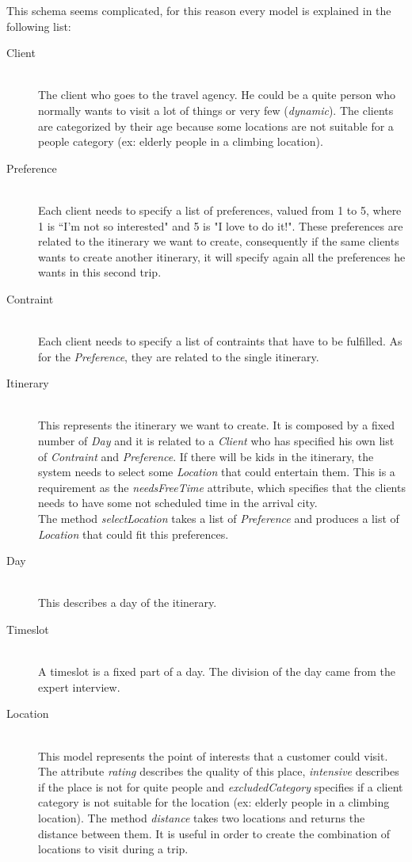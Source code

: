 \documentclass[11pt]{article} %
\begin{document}
This schema seems complicated, for this reason every model is explained in the following list:
\begin{description}
  \item[Client] \hfill \\
  The client who goes to the travel agency. He could be a quite person who normally wants to visit a lot of things or very few (\emph{dynamic}). The clients are categorized by their age because some locations are not suitable for a people category (ex: elderly people in a climbing location).

  \item[Preference] \hfill \\
  Each client needs to specify a list of preferences, valued from 1 to 5, where 1 is ``I'm not so interested" and 5 is "I love to do it!". These preferences are related to the itinerary we want to create, consequently if the same clients wants to create another itinerary, it will specify again all the preferences he wants in this second trip.
  \item[Contraint] \hfill \\
  Each client needs to specify a list of contraints that have to be fulfilled. As for the \emph{Preference}, they are related to the single itinerary.
  \item[Itinerary] \hfill \\
  This represents the itinerary we want to create. It is composed by a fixed number of \emph{Day} and it is related to a \emph{Client} who has specified his own list of \emph{Contraint} and \emph{Preference}. If there will be kids in the itinerary, the system needs to select some \emph{Location} that could entertain them. This is a requirement as the \emph{needsFreeTime} attribute, which specifies that the clients needs to have some not scheduled time in the arrival city.\\
The method \emph{selectLocation} takes a list of \emph{Preference} and produces a list of \emph{Location} that could fit this preferences. 
  \item[Day] \hfill \\
  This describes a day of the itinerary.
  \item[Timeslot] \hfill \\
  A timeslot is a fixed part of a day. The division of the day came from the expert interview.
\item[Location] \hfill \\
  This model represents the point of interests that a customer could visit. The attribute \emph{rating} describes the quality of this place, \emph{intensive} describes if the place is not for quite people and \emph{excludedCategory} specifies if a client category is not suitable for the location (ex: elderly people in a climbing location). The method \emph{distance} takes two locations and returns the distance between them. It is useful in order to create the combination of locations to visit during a trip.
\end{description}
\end{document}
